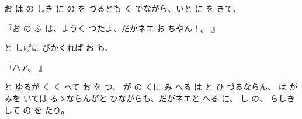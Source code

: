 
お
は
の
しき
に
の
を
づるとも
く
でながら、いと
に
を
きて、

『お
の
ふ
は、ようく
つたよ、だがネエ
お
ちやん！。
』

と
しげに
びかくれば
お
も、

『ハア。
』

と
ゆるが
く
く
へて
お
を
つ、
が
の
くに
み
へる
は
と
ひ
づるならん、
は
が
みを
いては
るゝならんがと
ひながらも、だがネエと
へる
に、
し
の、
らしき
して
の
を
たり。

